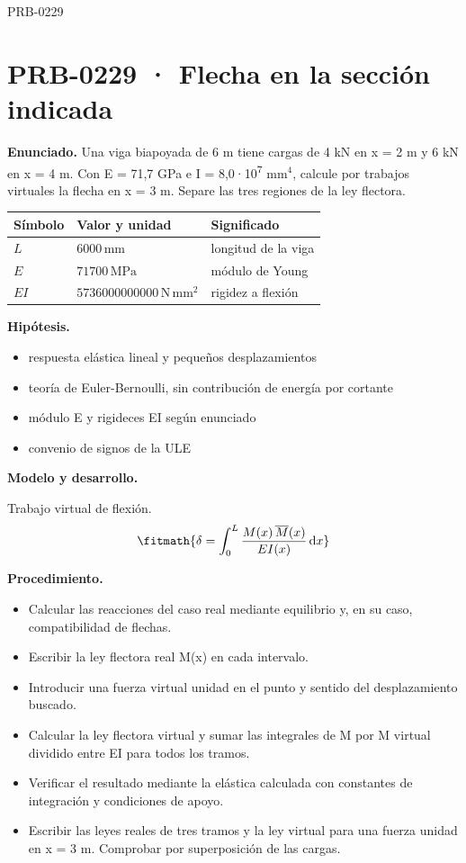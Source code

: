 \begin{studiumworked}{PRB-0229}

\section{PRB-0229 · Flecha en la sección indicada}

\textbf{Enunciado.} Una viga biapoyada de 6 m tiene cargas de 4 kN en x = 2 m y 6 kN en x = 4 m. Con E = 71,7 GPa e I = 8,0·10\textsuperscript{7} mm$^4$, calcule por trabajos virtuales la flecha en x = 3 m. Separe las tres regiones de la ley flectora.

\par\medskip\noindent\begin{tabular}{@{}p{.18\linewidth}p{.26\linewidth}p{.48\linewidth}@{}}
\toprule Símbolo & Valor y unidad & Significado\\\midrule
$L$ & $6000\,\mathrm{mm}$ & longitud de la viga\\
$E$ & $71700\,\mathrm{MPa}$ & módulo de Young\\
$EI$ & $5736000000000\,\mathrm{N\,mm^2}$ & rigidez a flexión\\
\bottomrule\end{tabular}\par\medskip

\textbf{Hipótesis.}\begin{itemize}\item respuesta elástica lineal y pequeños desplazamientos
\item teoría de Euler-Bernoulli, sin contribución de energía por cortante
\item módulo E y rigideces EI según enunciado
\item convenio de signos de la ULE\end{itemize}

\textbf{Modelo y desarrollo.}

Trabajo virtual de flexión.\[\fitmath{\delta = \int_{0}^{L}\frac{M(x)\,\overline{M}(x)}{E I(x)}\,\mathrm{d}x}\]

\textbf{Procedimiento.}\begin{itemize}\item Calcular las reacciones del caso real mediante equilibrio y, en su caso, compatibilidad de flechas.
\item Escribir la ley flectora real M(x) en cada intervalo.
\item Introducir una fuerza virtual unidad en el punto y sentido del desplazamiento buscado.
\item Calcular la ley flectora virtual y sumar las integrales de M por M virtual dividido entre EI para todos los tramos.
\item Verificar el resultado mediante la elástica calculada con constantes de integración y condiciones de apoyo.
\item Escribir las leyes reales de tres tramos y la ley virtual para una fuerza unidad en x = 3 m. Comprobar por superposición de las cargas.\end{itemize}


\end{studiumworked}
